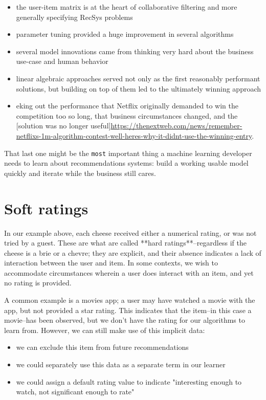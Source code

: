 \begin{itemize}
\item the user-item matrix is at the heart of collaborative filtering and more generally specifying RecSys problems
\item parameter tuning provided a huge improvement in several algorithms
\item several model innovations came from thinking very hard about the business use-case and human behavior
\item linear algebraic approaches served not only as the first reasonably performant solutions, but building on top of them led to the ultimately winning approach
\item eking out the performance that Netflix originally demanded to win the competition too so long, that business circumstances changed, and the [solution was no longer useful]\url{https://thenextweb.com/news/remember-netflixs-1m-algorithm-contest-well-heres-why-it-didnt-use-the-winning-entry}.
\end{itemize}

That last one might be the \lstinline{most} important thing a machine learning developer needs to learn about recommendations systems: build a working usable model quickly and iterate while the business still cares.


\section{Soft ratings}

In our example above, each cheese received either a numerical rating, or was not tried by a guest. These are what are called **hard ratings**–regardless if the cheese is a brie or a chevre; they are explicit, and their absence indicates a lack of interaction between the user and item. In some contexts, we wish to accommodate circumstances wherein a user does interact with an item, and yet no rating is provided.

A common example is a movies app; a user may have watched a movie with the app, but not provided a star rating. This indicates that the item–in this case a movie–has been observed, but we don't have the rating for our algorithms to learn from. However, we can still make use of this implicit data:

\begin{itemize}
\item we can exclude this item from future recommendations
\item we could separately use this data as a separate term in our learner
\item we could assign a default rating value to indicate "interesting enough to watch, not significant enough to rate"
\end{itemize}

